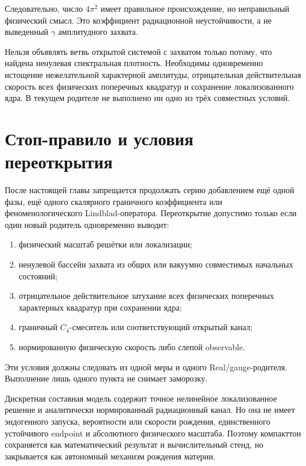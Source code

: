 Следовательно, число $4\pi^2$ имеет правильное происхождение, но
неправильный физический смысл. Это коэффициент радиационной
неустойчивости, а не выведенный $\gamma$ амплитудного захвата.

\begin{nogocriterion}
Нельзя объявлять ветвь открытой системой с захватом только потому, что
найдена ненулевая спектральная плотность. Необходимы одновременно
истощение нежелательной характерной амплитуды, отрицательная действительная
скорость всех физических поперечных квадратур и сохранение локализованного
ядра. В текущем родителе не выполнено ни одно из трёх совместных условий.
\end{nogocriterion}

\section{Стоп-правило и условия переоткрытия}

После настоящей главы запрещается продолжать серию добавлением ещё одной
фазы, ещё одного скалярного граничного коэффициента или феноменологического
Lindblad-оператора. Переоткрытие допустимо только если один новый
родитель одновременно выводит:
\begin{enumerate}
 \item физический масштаб решётки или локализации;
 \item ненулевой бассейн захвата из общих или вакуумно совместимых
 начальных состояний;
 \item отрицательное действительное затухание всех физических
 поперечных характерных квадратур при сохранении ядра;
 \item граничный $C_4$-смеситель или соответствующий открытый канал;
 \item нормированную физическую скорость либо слепой observable.
\end{enumerate}
Эти условия должны следовать из одной меры и одного Real/gauge-родителя.
Выполнение лишь одного пункта не снимает заморозку.

\begin{theorem}
Дискретная составная модель содержит точное нелинейное локализованное
решение и аналитически нормированный радиационный канал. Но она не имеет
эндогенного запуска, вероятности или скорости рождения, единственного
устойчивого endpoint и абсолютного физического масштаба. Поэтому
компакттон сохраняется как математический результат и вычислительный
стенд, но закрывается как автономный механизм рождения материи.
\end{theorem}

